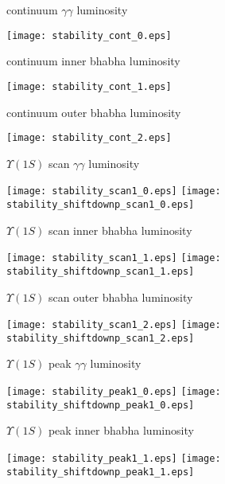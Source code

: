 \documentclass[12pt]{article}
\begin{document}
continuum $\gamma\gamma$ luminosity

\begin{center}
\texttt{[image: stability\_cont\_0.eps]}
\end{center}


\vfill continuum inner bhabha luminosity

\begin{center}
\texttt{[image: stability\_cont\_1.eps]}
\end{center}


\vfill continuum outer bhabha luminosity

\begin{center}
\texttt{[image: stability\_cont\_2.eps]}
\end{center}

\pagebreak

$\Upsilon(1S)$ scan $\gamma\gamma$ luminosity

\begin{center}
\texttt{[image: stability\_scan1\_0.eps]} \texttt{[image: stability\_shiftdownp\_scan1\_0.eps]}
\end{center}


\vfill $\Upsilon(1S)$ scan inner bhabha luminosity

\begin{center}
\texttt{[image: stability\_scan1\_1.eps]} \texttt{[image: stability\_shiftdownp\_scan1\_1.eps]}
\end{center}


\vfill $\Upsilon(1S)$ scan outer bhabha luminosity

\begin{center}
\texttt{[image: stability\_scan1\_2.eps]} \texttt{[image: stability\_shiftdownp\_scan1\_2.eps]}
\end{center}

\pagebreak

$\Upsilon(1S)$ peak $\gamma\gamma$ luminosity

\begin{center}
\texttt{[image: stability\_peak1\_0.eps]} \texttt{[image: stability\_shiftdownp\_peak1\_0.eps]}
\end{center}


\vfill $\Upsilon(1S)$ peak inner bhabha luminosity

\begin{center}
\texttt{[image: stability\_peak1\_1.eps]} \texttt{[image: stability\_shiftdownp\_peak1\_1.eps]}
\end{center}
\end{document}
